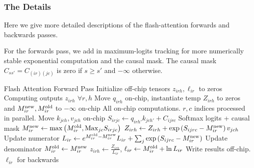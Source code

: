 \subsubsection{The Details \label{subsubsec_fa_details}}

Here we give more detailed descriptions of the flash-attention forwards and backwards passes.

For the forwards pass, we add in maximum-logits tracking for more numerically stable exponential
computation and the causal mask. The causal mask $ C _{ s s' } = C _{ (ir)(jc) } $ is zero if $ s \ge s' $ and $ -\infty $ otherwise.

\begin{algo}{Flash Attention Forward Pass}
\State Initialize off-chip tensors $ z _{ irh },  \ell _{ ir }$ to zeros \Comment Computing outputs $ z _{ irh } $ $ \forall r, h $
\State Move  $ q _{ irh }$ on-chip, instantiate temp $Z _{ irh }$ to zeros and $ M ^{ {\rm new} } _{ ir }, M ^{ {\rm old} } _{ ir } $ to $ -\infty $ on-chip
 \Comment All on-chip computations. $ r, c $ indices processed in parallel.
    \State Move  $ k_{ jch },v _{ jch }$ on-chip
    \State $ S _{ irjc } \gets   q _{ irh' } k _{ jch' } + C _{ ijrc } $ \Comment Softmax logits + causal mask
    \State $ M ^{ {\rm new} } _{ ir } \gets  \max \left ( M ^{ {\rm  old} } _{ ir }, {\rm Max}_{ jc }  S _{ irjc }  \right )   $
    \State $ Z _{ irh } \gets   Z _{ irh } +\exp \left (  S _{ ijrc } - M ^{ {\rm  new} } _{ ir }  \right ) v _{ jch }$ \Comment Update numerator
    \State $ L _{ ir } \gets   e ^{ M ^{ {\rm old} } _{ ir } - M ^{ {\rm  new} } _{ ir } } L _{ ir } +\sum _{ j }\exp \left (   S _{ ijrc } - M ^{ {\rm  new} } _{ ir }   \right ) $ \Comment Update denominator
    \State $ M ^{ {\rm old} } _{ ir } \gets  M ^{ {\rm  new} } _{ ir }   $
\EndFor
\State $ z _{ irh } \gets \frac{Z _{ irh }}{L _{ ir }}$, $  \ell _{ ir } \gets M ^{ {\rm old} } _{ ir } + \ln L _{ ir }$ \Comment Write results off-chip. $ \ell _{ ir } $ for backwards
\EndFor
\label{algo_fa_fwd_advanced}
\end{algo}

